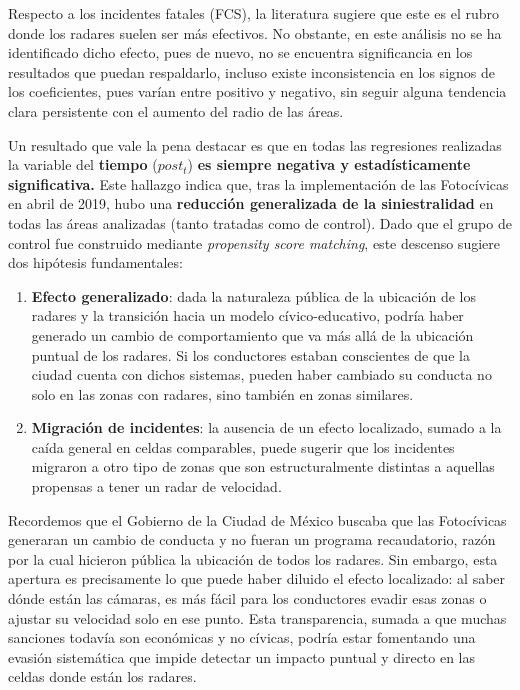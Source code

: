 Respecto a los incidentes fatales (FCS), la literatura sugiere que este es el rubro donde los radares suelen ser más efectivos. No obstante, en este análisis no se ha identificado dicho efecto, pues de nuevo, no se encuentra significancia en los resultados que puedan respaldarlo, incluso existe inconsistencia en los signos de los coeficientes, pues varían entre positivo y negativo, sin seguir alguna tendencia clara persistente con el aumento del radio de las áreas. 

Un resultado que vale la pena destacar es que en todas las regresiones realizadas la variable del \textbf{tiempo} ($post_t$) \textbf{es siempre negativa y estadísticamente significativa.} Este hallazgo indica que, tras la implementación de las Fotocívicas en abril de 2019, hubo una \textbf{reducción generalizada de la siniestralidad} en todas las áreas analizadas (tanto tratadas como de control). Dado que el grupo de control fue construido mediante \textit{propensity score matching}, este descenso sugiere dos hipótesis fundamentales:

\begin{enumerate}
    \item \textbf{Efecto generalizado}: dada la naturaleza pública de la ubicación de los radares y la transición hacia un modelo cívico-educativo, podría haber generado un cambio de comportamiento que va más allá de la ubicación puntual de los radares. Si los conductores estaban conscientes de que la ciudad cuenta con dichos sistemas, pueden haber cambiado su conducta no solo en las zonas con radares, sino también en zonas similares. 
    \item \textbf{Migración de incidentes}: la ausencia de un efecto localizado, sumado a la caída general en celdas comparables, puede sugerir que los incidentes migraron a otro tipo de zonas que son estructuralmente distintas a aquellas propensas a tener un radar de velocidad.
\end{enumerate}

Recordemos que el Gobierno de la Ciudad de México buscaba que las Fotocívicas generaran un cambio de conducta y no fueran un programa recaudatorio, razón por la cual hicieron pública la ubicación de todos los radares. Sin embargo, esta apertura es precisamente lo que puede haber diluido el efecto localizado: al saber dónde están las cámaras, es más fácil para los conductores evadir esas zonas o ajustar su velocidad solo en ese punto. Esta transparencia, sumada a que muchas sanciones todavía son económicas y no cívicas, podría estar fomentando una evasión sistemática que impide detectar un impacto puntual y directo en las celdas donde están los radares.

